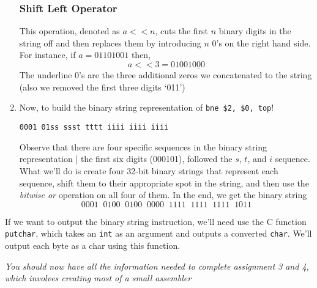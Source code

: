 \documentclass{report}
\begin{document}
\begin{enumerate}
\subsubsection{Shift Left Operator}
This operation, denoted as $a << n$, cuts the first $n$ binary digits in the string off and then replaces them by introducing $n$ 0's on the right hand side. For instance, if $a = 01101001$ then,
$$a << 3 = 01001\underline{000}$$
The underline 0's are the three additional zeros we concatenated to the string (also we removed the first three digits `011')
\item Now, to build the binary string representation of \texttt{bne \$2, \$0, top}! 
\begin{center}
\texttt{0001 01ss ssst tttt iiii iiii iiii}
\end{center}
Observe that there are four specific sequences in the binary string representation | the first six digits (000101), followed the $s$, $t$, and $i$ sequence. What we'll do is create four 32-bit binary strings that represent each sequence, shift them to their appropriate spot in the string, and then use the \textit{bitwise or} operation on all four of them. In the end, we get the binary string
$$0001 \;\; 0100 \;\; 0100 \;\; 0000 \;\; 1111\;\;1111\;\;1111\;\;1011$$
\end{enumerate}
If we want to output the binary string instruction, we'll need use the C function \texttt{putchar}, which takes an \texttt{int} as an argument and outputs a converted \texttt{char}. We'll output each byte as a char using this function.
\begin{center}
\textit{You should now have all the information needed to complete assignment 3 and 4, which involves creating most of a small assembler}

\end{center}
\end{document}
